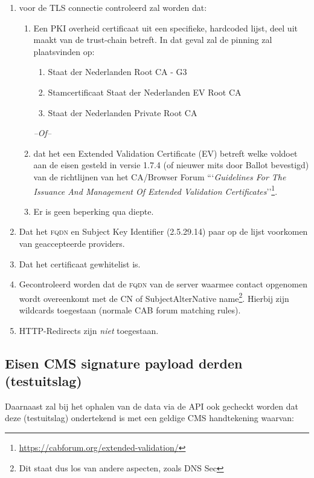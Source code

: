 \documentclass[11.0pt,twoside,openright]{report}
\begin{document}
\begin{enumerate}
\item voor de TLS connectie controleerd zal worden dat: 
\begin{enumerate}
\item Een PKI overheid certificaat uit een specifieke, hardcoded lijst, deel uit maakt van de trust-chain betreft. In dat geval zal de pinning zal plaatsvinden op:
\begin{enumerate}
\item Staat der Nederlanden Root CA - G3
\item Stamcertificaat Staat der Nederlanden EV Root CA 
\item Staat der Nederlanden Private Root CA 
\end{enumerate}

\emph{--Of--}

\item  dat het een Extended Validation Certificate (EV) betreft welke voldoet aan de eisen gesteld in versie 1.7.4 (of nieuwer mits door Ballot bevestigd) van de richtlijnen van het CA/Browser Forum ```\emph{Guidelines For The Issuance And Management Of Extended Validation Certificates}''\footnote{\url{https://cabforum.org/extended-validation/}}.
\item Er is geen beperking qua diepte.
\end{enumerate}
\item   Dat het \textsc{fqdn} en Subject Key Identifier (2.5.29.14) paar op de lijst voorkomen van geaccepteerde providers.
\item 	Dat het certificaat gewhitelist is.
\item 	Gecontroleerd worden dat de \textsc{fqdn} van de server waarmee contact opgenomen wordt overeenkomt met de CN of SubjectAlterNative name\footnote{Dit staat dus los van andere aspecten, zoals DNS Sec}. Hierbij zijn wildcards toegestaan (normale CAB forum matching rules).
\item HTTP-Redirects zijn \emph{niet} toegestaan.
\end{enumerate}

\subsection{Eisen CMS signature payload derden (testuitslag)}

Daarnaast zal bij het ophalen van de data via de API ook gecheckt worden dat deze (testuitslag) ondertekend is met een geldige CMS handtekening waarvan:
\end{document}
